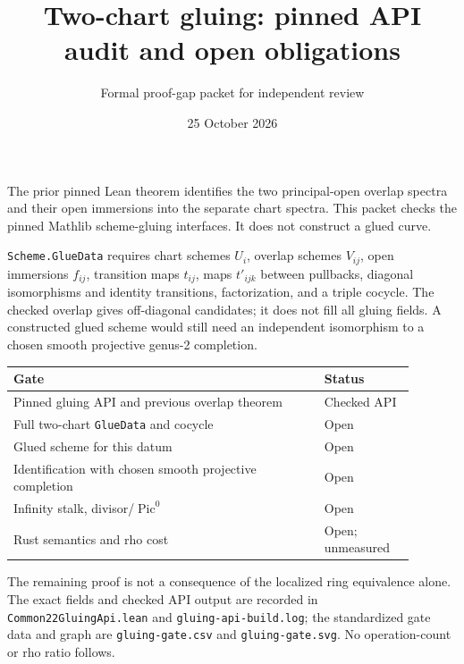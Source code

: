 \documentclass[11pt]{article}
\title{Two-chart gluing: pinned API audit and open obligations}
\author{Formal proof-gap packet for independent review}
\date{25 October 2026}
\begin{document}
\maketitle
The prior pinned Lean theorem identifies the two principal-open overlap spectra and their open immersions into the separate chart spectra. This packet checks the pinned Mathlib scheme-gluing interfaces. It does not construct a glued curve.

\texttt{Scheme.GlueData} requires chart schemes $U_i$, overlap schemes $V_{ij}$, open immersions $f_{ij}$, transition maps $t_{ij}$, maps $t'_{ijk}$ between pullbacks, diagonal isomorphisms and identity transitions, factorization, and a triple cocycle. The checked overlap gives off-diagonal candidates; it does not fill all gluing fields. A constructed glued scheme would still need an independent isomorphism to a chosen smooth projective genus-2 completion.

\begin{center}\begin{tabular}{p{0.69\linewidth}p{0.2\linewidth}}\toprule
Gate & Status\\\midrule
Pinned gluing API and previous overlap theorem & Checked API\\
Full two-chart \texttt{GlueData} and cocycle & Open\\
Glued scheme for this datum & Open\\
Identification with chosen smooth projective completion & Open\\
Infinity stalk, divisor/$\operatorname{Pic}^0$ & Open\\
Rust semantics and rho cost & Open; unmeasured\\\bottomrule\end{tabular}\end{center}

The remaining proof is not a consequence of the localized ring equivalence alone. The exact fields and checked API output are recorded in \texttt{Common22GluingApi.lean} and \texttt{gluing-api-build.log}; the standardized gate data and graph are \texttt{gluing-gate.csv} and \texttt{gluing-gate.svg}. No operation-count or rho ratio follows.
\end{document}
